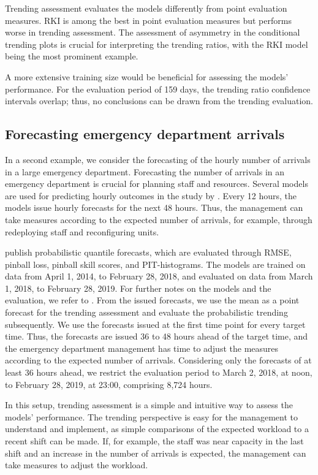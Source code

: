 Trending assessment evaluates the models differently from point evaluation measures.
RKI is among the best in point evaluation measures but performs worse in trending assessment.
The assessment of asymmetry in the conditional trending plots is crucial for interpreting the trending ratios, with the RKI model being the most prominent example.

A more extensive training size would be beneficial for assessing the models' performance.
For the evaluation period of 159 days, the trending ratio confidence intervals overlap; thus, no conclusions can be drawn from the trending evaluation.

\subsection{Forecasting emergency department arrivals}\label{sec:application-eda}

In a second example, we consider the forecasting of the hourly number of arrivals in a large emergency department.
Forecasting the number of arrivals in an emergency department is crucial for planning staff and resources.
Several models are used for predicting hourly outcomes in the study by \textcite{Rostami-Tabar2023}.
Every 12 hours, the models issue hourly forecasts for the next 48 hours.
Thus, the management can take measures according to the expected number of arrivals, for example, through redeploying staff and reconfiguring units.

\textcite{Rostami-Tabar2023} publish probabilistic quantile forecasts, which are evaluated through RMSE, pinball loss, pinball skill scores, and PIT-histograms.
The models are trained on data from April 1, 2014, to February 28, 2018, and evaluated on data from March 1, 2018, to February 28, 2019.
For further notes on the models and the evaluation, we refer to \textcite{Rostami-Tabar2023}.
From the issued forecasts, we use the mean as a point forecast for the trending assessment and evaluate the probabilistic trending subsequently.
We use the forecasts issued at the first time point for every target time.
Thus, the forecasts are issued 36 to 48 hours ahead of the target time, and the emergency department management has time to adjust the measures according to the expected number of arrivals.
Considering only the forecasts of at least 36 hours ahead, we restrict the evaluation period to March 2, 2018, at noon, to February 28, 2019, at 23:00, comprising 8,724 hours.

In this setup, trending assessment is a simple and intuitive way to assess the models' performance.
The trending perspective is easy for the management to understand and implement, as simple comparisons of the expected workload to a recent shift can be made.
If, for example, the staff was near capacity in the last shift and an increase in the number of arrivals is expected, the management can take measures to adjust the workload.

